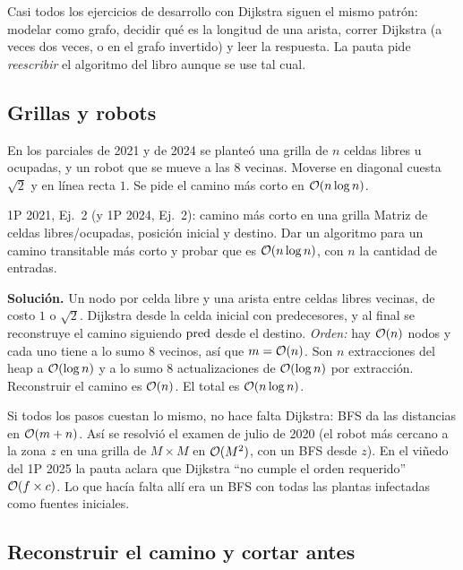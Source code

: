 Casi todos los ejercicios de desarrollo con Dijkstra siguen el mismo patrón: modelar como grafo, decidir qué es la longitud de una arista, correr Dijkstra (a veces dos veces, o en el grafo invertido) y leer la respuesta. La pauta pide \emph{reescribir} el algoritmo del libro aunque se use tal cual.

\subsection{Grillas y robots}

En los parciales de 2021 y de 2024 se planteó una grilla de $n$ celdas libres u ocupadas, y un robot que se mueve a las 8 vecinas. Moverse en diagonal cuesta $\sqrt2$ y en línea recta $1$. Se pide el camino más corto en $\mathcal{O}(n\log n)$.

\begin{problema}{1P 2021, Ej.~2 (y 1P 2024, Ej.~2): camino más corto en una grilla}
Matriz de celdas libres/ocupadas, posición inicial y destino. Dar un algoritmo para un camino transitable más corto y probar que es $\mathcal{O}(n\log n)$, con $n$ la cantidad de entradas.

\smallskip
\textbf{Solución.} Un nodo por celda libre y una arista entre celdas libres vecinas, de costo $1$ o $\sqrt2$. Dijkstra desde la celda inicial con predecesores, y al final se reconstruye el camino siguiendo $\mathrm{pred}$ desde el destino. \emph{Orden:} hay $\mathcal{O}(n)$ nodos y cada uno tiene a lo sumo $8$ vecinos, así que $m=\mathcal{O}(n)$. Son $n$ extracciones del heap a $\mathcal{O}(\log n)$ y a lo sumo $8$ actualizaciones de $\mathcal{O}(\log n)$ por extracción. Reconstruir el camino es $\mathcal{O}(n)$. El total es $\mathcal{O}(n\log n)$.
\end{problema}

Si todos los pasos cuestan lo mismo, no hace falta Dijkstra: BFS da las distancias en $\mathcal{O}(m+n)$. Así se resolvió el examen de julio de 2020 (el robot más cercano a la zona $z$ en una grilla de $M\times M$ en $\mathcal{O}(M^2)$, con un BFS desde $z$). En el viñedo del 1P 2025 la pauta aclara que Dijkstra ``no cumple el orden requerido'' $\mathcal{O}(f\times c)$. Lo que hacía falta allí era un BFS con todas las plantas infectadas como fuentes iniciales.

\subsection{Reconstruir el camino y cortar antes}

